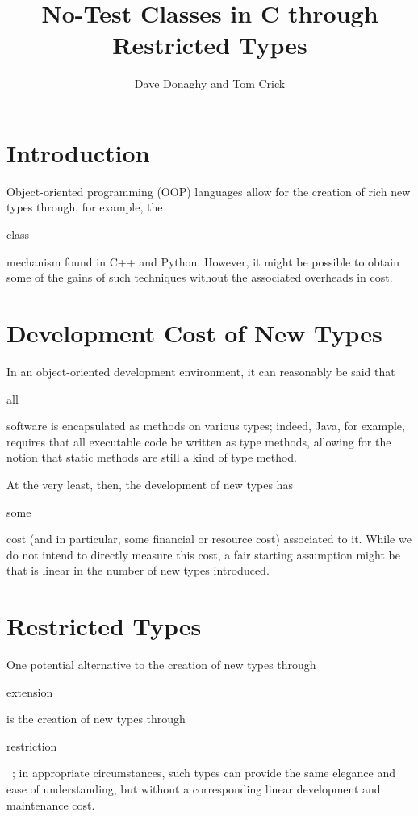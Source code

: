 \documentclass{eceasst}
\title{No-Test Classes in C through Restricted Types} %
\author{%
Dave Donaghy\autref{1} and 
Tom Crick\autref{2}}
\institute{%
\autlabel{1} \email{dave.donaghy@hp.com}\\
HP Bristol, UK\par
\autlabel{2} \email{tcrick@cardiffmet.ac.uk}\\
Department of Computing\\
Cardiff Metropolitan University, UK}
\begin{document}
\maketitle

\section{Introduction}

Object-oriented programming (OOP) languages allow for the creation of
rich new types through, for example, the \begin{tt}class\end{tt}
mechanism found in C++ and Python. However, it might be possible to
obtain some of the gains of such techniques without the associated
overheads in cost.

\section{Development Cost of New Types}

In an object-oriented development environment, it can reasonably be
said that \begin{em}all\end{em} software is encapsulated as methods on
various types; indeed, Java, for example, requires that all executable
code be written as type methods, allowing for the notion that static
methods are still a kind of type method.

At the very least, then, the development of new types has
\begin{em}some\end{em} cost (and in particular, some financial or
resource cost) associated to it.  While we do not intend to directly
measure this cost, a fair starting assumption might be that is linear
in the number of new types introduced.

\section{Restricted Types}
One potential alternative to the creation of new types through
\begin{em}extension\end{em} is the creation of new types through
\begin{em}restriction\end{em}~\cite{nystrom-et-al:2008}; in
appropriate circumstances, such types can provide the same elegance
and ease of understanding, but without a corresponding linear
development and maintenance cost.
\end{document}
